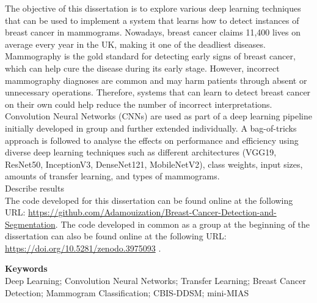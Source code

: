 

The objective of this dissertation is to explore various deep learning techniques that can be used to implement a system that learns how to detect instances of breast cancer in mammograms. Nowadays, breast cancer claims 11,400 lives on average every year in the UK, making it one of the deadliest diseases. Mammography is the gold standard for detecting early signs of breast cancer, which can help cure the disease during its early stage. However, incorrect mammography diagnoses are common and may harm patients through absent or unnecessary operations. Therefore, systems that can learn to detect breast cancer on their own could help reduce the number of incorrect interpretations.\\

Convolution Neural Networks (CNNs) are used as part of a deep learning pipeline initially developed in group and further extended individually. A bag-of-tricks approach is followed to analyse the effects on performance and efficiency using diverse deep learning techniques such as different architectures (VGG19, ResNet50, InceptionV3, DenseNet121, MobileNetV2), class weights, input sizes, amounts of transfer learning, and types of mammograms.\\

Describe results\\

The code developed for this dissertation can be found online at the following URL: \url{https://github.com/Adamouization/Breast-Cancer-Detection-and-Segmentation}. The code developed in common as a group at the beginning of the dissertation can also be found online at the following URL: \url{https://doi.org/10.5281/zenodo.3975093} \citep{adam_jaamour_2020_3975093}.

\vspace{12mm}
\begin{center}

\textbf{Keywords}\\
\vspace{5mm}
Deep Learning; Convolution Neural Networks; Transfer Learning; Breast Cancer Detection; Mammogram Classification; CBIS-DDSM; mini-MIAS

\end{center}

